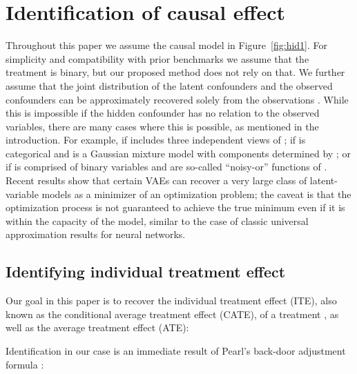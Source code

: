 \documentclass{article}
\begin{document}
 
\section{Identification of causal effect}\label{sec:ident}
Throughout this paper we assume the causal model in Figure~\ref{fig:hid1}. For simplicity and compatibility with prior benchmarks we assume that the treatment  is binary, but our proposed method does not rely on that. We further assume that the joint distribution  of the latent confounders  and the observed confounders  can be approximately recovered solely from the observations . While this is impossible if the hidden confounder has no relation to the observed variables, there are many cases where this is possible, as mentioned in the introduction.
For example, if  includes three independent views of  \citep{anandkumar2012method,hsu2012spectral,goodman1974exploratory,allman2009identifiability}; if  is categorical and  is a Gaussian mixture model with components determined by  \citep{anandkumar2014tensor};  or if  is comprised of binary variables and  are so-called ``noisy-or'' functions of  \citep{jernite2013discovering,tengyu_noisyor16}. Recent results show that certain VAEs can recover a very large class of latent-variable models \citep{tran2015variational} as a minimizer of an optimization problem; the caveat is that the optimization process is not guaranteed to achieve the true minimum even if it is within the capacity of the model, similar to the case of classic universal approximation results for neural networks.

\subsection{Identifying individual treatment effect}
Our goal in this paper is to recover the individual treatment effect (ITE), also known as the conditional average treatment effect (CATE), of a treatment , as well as the average treatment effect (ATE):

Identification in our case is an immediate result of Pearl's back-door adjustment formula \citep{pearl2009causality}:
\end{document}
